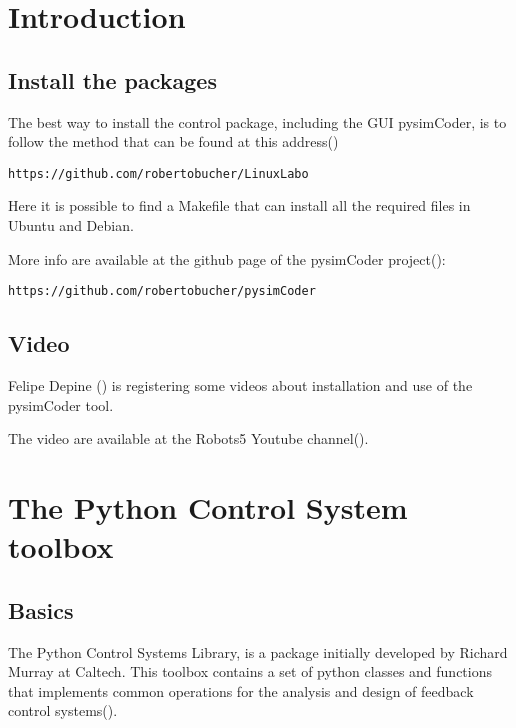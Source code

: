 \chapter{Introduction}

\section{Install the packages}

The best way to install the control package, including the GUI pysimCoder, is to follow the method that can be found at this address(\cite{LINUXLABO})

\begin{verbatim}
https://github.com/robertobucher/LinuxLabo
\end{verbatim}

Here it is possible to find a Makefile that can install all the required files in Ubuntu and Debian.

%

More info are available at the github page of the pysimCoder project(\cite{SUPSICTRL}):

\begin{verbatim}
https://github.com/robertobucher/pysimCoder
\end{verbatim}

\section{Video}

Felipe Depine (\cite{ROBOT5}) is registering some videos about installation and use of the pysimCoder tool.

The video are available at the Robots5 Youtube channel(\cite{ROBOT5YT}).

\chapter{The Python Control System toolbox}
\section{Basics}

The Python Control Systems Library, is a package initially developed by Richard Murray at Caltech. This toolbox  contains a set of python classes and functions that implements common operations for the analysis and design of feedback control systems(\cite{MANUALTBX}).


